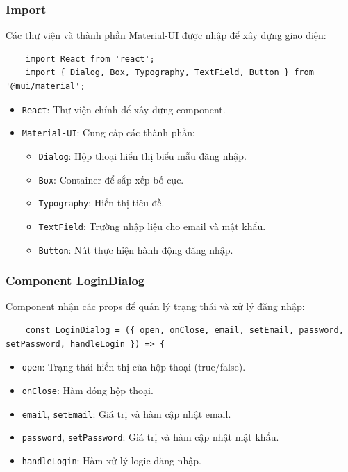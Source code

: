            \subsubsection{Import}
                \hspace*{0.6cm}Các thư viện và thành phần Material-UI được nhập để xây dựng giao diện:
                \begin{lstlisting}
    import React from 'react';
    import { Dialog, Box, Typography, TextField, Button } from '@mui/material';
                \end{lstlisting}
                \begin{itemize}
                    \item \texttt{React}: Thư viện chính để xây dựng component.
                    \item \texttt{Material-UI}: Cung cấp các thành phần:
                    \begin{itemize}
                        \item \texttt{Dialog}: Hộp thoại hiển thị biểu mẫu đăng nhập.
                        \item \texttt{Box}: Container để sắp xếp bố cục.
                        \item \texttt{Typography}: Hiển thị tiêu đề.
                        \item \texttt{TextField}: Trường nhập liệu cho email và mật khẩu.
                        \item \texttt{Button}: Nút thực hiện hành động đăng nhập.
                    \end{itemize}
                \end{itemize}

            \subsubsection{Component LoginDialog}
                \hspace*{0.6cm}Component nhận các props để quản lý trạng thái và xử lý đăng nhập:
                \begin{lstlisting}
    const LoginDialog = ({ open, onClose, email, setEmail, password, setPassword, handleLogin }) => {
                \end{lstlisting}
                \begin{itemize}
                    \item \texttt{open}: Trạng thái hiển thị của hộp thoại (true/false).
                    \item \texttt{onClose}: Hàm đóng hộp thoại.
                    \item \texttt{email}, \texttt{setEmail}: Giá trị và hàm cập nhật email.
                    \item \texttt{password}, \texttt{setPassword}: Giá trị và hàm cập nhật mật khẩu.
                    \item \texttt{handleLogin}: Hàm xử lý logic đăng nhập.
                \end{itemize}

